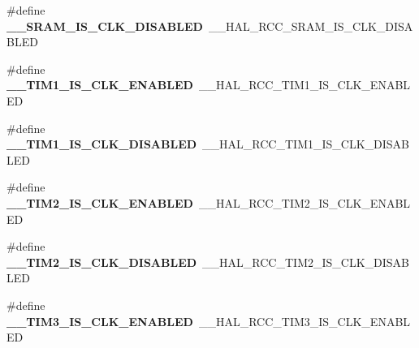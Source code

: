 \begin{DoxyCompactItemize}
\item 
\hypertarget{group___h_a_l___r_c_c___aliased_ga7b00de661df4e1dc8b36d9e1976b71a4}{\#define {\bfseries \-\_\-\-\_\-\-S\-R\-A\-M\-\_\-\-I\-S\-\_\-\-C\-L\-K\-\_\-\-D\-I\-S\-A\-B\-L\-E\-D}~\-\_\-\-\_\-\-H\-A\-L\-\_\-\-R\-C\-C\-\_\-\-S\-R\-A\-M\-\_\-\-I\-S\-\_\-\-C\-L\-K\-\_\-\-D\-I\-S\-A\-B\-L\-E\-D}\label{group___h_a_l___r_c_c___aliased_ga7b00de661df4e1dc8b36d9e1976b71a4}

\item 
\hypertarget{group___h_a_l___r_c_c___aliased_ga6f1ed81157e63c93719376c7077e4784}{\#define {\bfseries \-\_\-\-\_\-\-T\-I\-M1\-\_\-\-I\-S\-\_\-\-C\-L\-K\-\_\-\-E\-N\-A\-B\-L\-E\-D}~\-\_\-\-\_\-\-H\-A\-L\-\_\-\-R\-C\-C\-\_\-\-T\-I\-M1\-\_\-\-I\-S\-\_\-\-C\-L\-K\-\_\-\-E\-N\-A\-B\-L\-E\-D}\label{group___h_a_l___r_c_c___aliased_ga6f1ed81157e63c93719376c7077e4784}

\item 
\hypertarget{group___h_a_l___r_c_c___aliased_ga0105023c626e29aa2288e6e7d3cc524f}{\#define {\bfseries \-\_\-\-\_\-\-T\-I\-M1\-\_\-\-I\-S\-\_\-\-C\-L\-K\-\_\-\-D\-I\-S\-A\-B\-L\-E\-D}~\-\_\-\-\_\-\-H\-A\-L\-\_\-\-R\-C\-C\-\_\-\-T\-I\-M1\-\_\-\-I\-S\-\_\-\-C\-L\-K\-\_\-\-D\-I\-S\-A\-B\-L\-E\-D}\label{group___h_a_l___r_c_c___aliased_ga0105023c626e29aa2288e6e7d3cc524f}

\item 
\hypertarget{group___h_a_l___r_c_c___aliased_gab47df1a0dae3104f5ead354b24c37a1e}{\#define {\bfseries \-\_\-\-\_\-\-T\-I\-M2\-\_\-\-I\-S\-\_\-\-C\-L\-K\-\_\-\-E\-N\-A\-B\-L\-E\-D}~\-\_\-\-\_\-\-H\-A\-L\-\_\-\-R\-C\-C\-\_\-\-T\-I\-M2\-\_\-\-I\-S\-\_\-\-C\-L\-K\-\_\-\-E\-N\-A\-B\-L\-E\-D}\label{group___h_a_l___r_c_c___aliased_gab47df1a0dae3104f5ead354b24c37a1e}

\item 
\hypertarget{group___h_a_l___r_c_c___aliased_gae39de686b2eac091789e171236cb2456}{\#define {\bfseries \-\_\-\-\_\-\-T\-I\-M2\-\_\-\-I\-S\-\_\-\-C\-L\-K\-\_\-\-D\-I\-S\-A\-B\-L\-E\-D}~\-\_\-\-\_\-\-H\-A\-L\-\_\-\-R\-C\-C\-\_\-\-T\-I\-M2\-\_\-\-I\-S\-\_\-\-C\-L\-K\-\_\-\-D\-I\-S\-A\-B\-L\-E\-D}\label{group___h_a_l___r_c_c___aliased_gae39de686b2eac091789e171236cb2456}

\item 
\hypertarget{group___h_a_l___r_c_c___aliased_ga7a81a91683178ecfc7ec096653e9afc8}{\#define {\bfseries \-\_\-\-\_\-\-T\-I\-M3\-\_\-\-I\-S\-\_\-\-C\-L\-K\-\_\-\-E\-N\-A\-B\-L\-E\-D}~\-\_\-\-\_\-\-H\-A\-L\-\_\-\-R\-C\-C\-\_\-\-T\-I\-M3\-\_\-\-I\-S\-\_\-\-C\-L\-K\-\_\-\-E\-N\-A\-B\-L\-E\-D}\label{group___h_a_l___r_c_c___aliased_ga7a81a91683178ecfc7ec096653e9afc8}


\end{DoxyCompactItemize}
